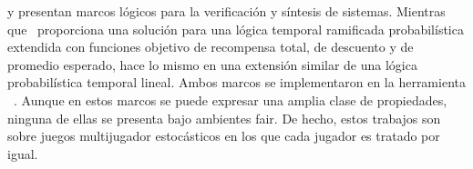 \cite{DBLP:journals/fmsd/ChenFKPS13} y \cite{SvorenovaKwiatkowska16} presentan marcos lógicos para la verificación y síntesis de sistemas. Mientras que~\cite{DBLP:journals/fmsd/ChenFKPS13} proporciona una solución para una lógica temporal ramificada probabilística extendida con funciones objetivo de recompensa total, de descuento y de promedio esperado, \cite{SvorenovaKwiatkowska16} hace lo mismo en una extensión similar de una lógica probabilística temporal lineal. Ambos marcos se implementaron en la herramienta \Prism~\cite{DBLP:conf/cav/KwiatkowskaN0S20,DBLP:conf/cav/KwiatkowskaNP11}. Aunque en estos marcos se puede expresar una amplia clase de propiedades, ninguna de ellas se presenta bajo ambientes fair. De hecho, estos trabajos son sobre juegos multijugador estocásticos en los que cada jugador es tratado por igual.


